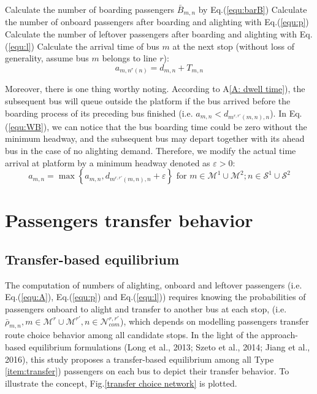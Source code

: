 \documentclass[smallextended]{svjour3}       %
\begin{document}
\begin{Abstract}
\begin{algorithm}[H]
\begin{algorithmic}
                  \STATE Calculate the number of boarding passengers $\bar{B}_{m,n}$ by Eq.(\ref{equ:barB})
                  \STATE Calculate the number of onboard passengers after boarding and alighting with Eq.(\ref{equ:p})     
                  \STATE Calculate the number of leftover passengers after boarding and alighting with Eq.(\ref{equ:l})   
                      \STATE Calculate the arrival time of bus $m$ at the next stop (without loss of generality, assume bus $m$ belongs to line $r$):
                      \begin{equation}
                          \label{equ:a}
                          a_{m,n^{r}(n)}=d_{m,n}+T_{m,n}
                      \end{equation}
                  \ENDIF

              \ENDFOR
          \ENDFOR
      \ENDFOR
  \end{algorithmic}
\end{algorithm}
Moreover, there is one thing worthy noting. 
According to A\ref{A: dwell time}), the subsequent bus will queue outside the platform
if the bus arrived before the boarding process of its preceding bus finished (i.e. $a_{m,n}<d_{m^{r,r'}(m,n),n}$). 
In \textup{Eq.(\ref{equ:WB})}, we can notice that the bus boarding time could be zero
without the minimum headway, and the subsequent bus may depart together with its ahead bus in the case of no alighting demand.
Therefore, we modify the actual time arrival at platform by a minimum headway denoted as $\varepsilon>0$: 
\begin{equation}
        a_{m,n} = \max \left\{a_{m,n},d_{m^{r,r'}(m,n),n}+\varepsilon\right\} 
        \text{ for } m\in \mathcal{M}^{1}\cup\mathcal{M}^{2};
        n\in \mathcal{S}^{1}\cup\mathcal{S}^{2}
\end{equation}

\section{Passengers transfer behavior}\label{Transfer passenger routing}
\subsection{Transfer-based equilibrium}\label{equilibrium}
The computation of numbers of alighting, onboard and leftover passengers (i.e. Eq.(\ref{equ:A}), Eq.(\ref{equ:p}) and Eq.(\ref{equ:l})) requires knowing the probabilities of passengers onboard to alight and transfer to another bus at each stop, (i.e. $\bar{\rho}_{m,n}, m\in\mathcal{M}^{r}\cup\mathcal{M}^{r'},n\in\mathcal{N}_{com}^{r,r'}$), which depends on modelling passengers transfer route choice behavior among all candidate stops.  
In the light of the approach-based equilibrium formulations \textrm{(Long et al., 2013; Szeto et al., 2014; Jiang et al., 2016)}, this study proposes a transfer-based equilibrium among all Type \ref{item:transfer}) passengers on each bus to depict their transfer behavior.
To illustrate the concept, Fig.\ref{transfer choice network} is plotted.


\end{Abstract}
\end{document}
